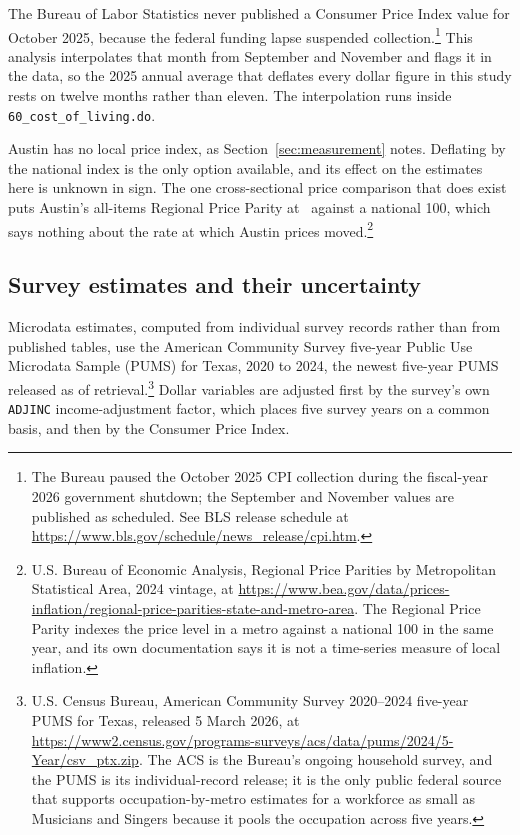 The Bureau of Labor Statistics never published a Consumer Price Index value
for October 2025, because the federal funding lapse suspended
collection.\footnote{The Bureau paused the October 2025 CPI collection during
the fiscal-year 2026 government shutdown; the September and November values
are published as scheduled. See BLS release schedule at
\url{https://www.bls.gov/schedule/news_release/cpi.htm}.} This analysis
interpolates that month from September and November and flags it in the data,
so the 2025 annual average that deflates every dollar figure in this study
rests on twelve months rather than eleven. The interpolation runs inside
\texttt{60\_cost\_of\_living.do}.

Austin has no local price index, as Section~\ref{sec:measurement} notes.
Deflating by the national index is the only option available, and its effect
on the estimates here is unknown in sign. The one cross-sectional price
comparison that does exist puts Austin's all-items Regional Price Parity at
\NColRppAllitemsAustin\ against a national 100, which says nothing about the
rate at which Austin prices moved.\footnote{U.S. Bureau of Economic Analysis,
Regional Price Parities by Metropolitan Statistical Area, 2024 vintage, at
\url{https://www.bea.gov/data/prices-inflation/regional-price-parities-state-and-metro-area}.
The Regional Price Parity indexes the price level in a metro against a
national 100 in the same year, and its own documentation says it is not a
time-series measure of local inflation.}

\subsection{Survey estimates and their uncertainty}

Microdata estimates, computed from individual survey records rather than from
published tables, use the American Community Survey five-year Public Use
Microdata Sample (PUMS) for Texas, 2020 to 2024, the newest five-year PUMS
released as of retrieval.\footnote{U.S. Census Bureau, American Community
Survey 2020--2024 five-year PUMS for Texas, released 5 March 2026, at
\url{https://www2.census.gov/programs-surveys/acs/data/pums/2024/5-Year/csv_ptx.zip}.
The ACS is the Bureau's ongoing household survey, and the PUMS is its
individual-record release; it is the only public federal source that supports
occupation-by-metro estimates for a workforce as small as Musicians and
Singers because it pools the occupation across five years.} Dollar variables
are adjusted first by the survey's own \texttt{ADJINC} income-adjustment
factor, which places five survey years on a common basis, and then by the
Consumer Price Index.

